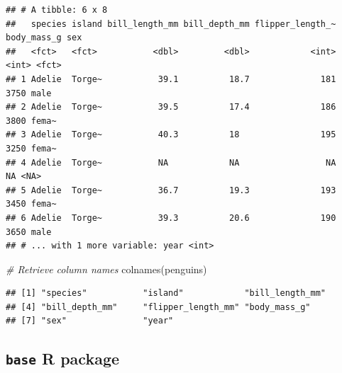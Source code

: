 \documentclass[
]{book}
\newenvironment{Shaded}{\begin{snugshade}}{\end{snugshade}}
\newcommand{\CommentTok}[1]{\textcolor[rgb]{0.56,0.35,0.01}{\textit{#1}}}
\newcommand{\FunctionTok}[1]{\textcolor[rgb]{0.00,0.00,0.00}{#1}}
\newcommand{\NormalTok}[1]{#1}
\begin{document}
\begin{verbatim}
## # A tibble: 6 x 8
##   species island bill_length_mm bill_depth_mm flipper_length_~ body_mass_g sex  
##   <fct>   <fct>           <dbl>         <dbl>            <int>       <int> <fct>
## 1 Adelie  Torge~           39.1          18.7              181        3750 male 
## 2 Adelie  Torge~           39.5          17.4              186        3800 fema~
## 3 Adelie  Torge~           40.3          18                195        3250 fema~
## 4 Adelie  Torge~           NA            NA                 NA          NA <NA> 
## 5 Adelie  Torge~           36.7          19.3              193        3450 fema~
## 6 Adelie  Torge~           39.3          20.6              190        3650 male 
## # ... with 1 more variable: year <int>
\end{verbatim}

\begin{Shaded}
\begin{Highlighting}[]
\CommentTok{\# Retrieve column names}
\FunctionTok{colnames}\NormalTok{(penguins)}
\end{Highlighting}
\end{Shaded}

\begin{verbatim}
## [1] "species"           "island"            "bill_length_mm"   
## [4] "bill_depth_mm"     "flipper_length_mm" "body_mass_g"      
## [7] "sex"               "year"
\end{verbatim}

\hypertarget{base-r-package}{%
\subsection{\texorpdfstring{\texttt{base} R package}{base R package}}\label{base-r-package}}
\end{document}
